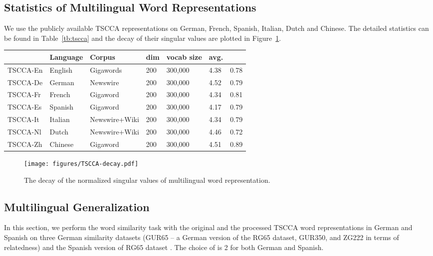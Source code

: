 \documentclass{article} \usepackage{acl2017,times}
\begin{document}
\subsection{Statistics of Multilingual Word Representations}
We use the publicly available TSCCA representations \citep{dhillon2012two} on German, French, Spanish, Italian, Dutch and Chinese. The detailed statistics can be found in Table~\ref{tb:tscca} and the decay of their singular values are plotted in Figure~\ref{fig:tscca-decay}.

\begin{table*}[!h]
\begin{center}
\begin{tabular}{|l|l|l|l|l|l|l|}
\hline
 &  \bf Language &  \bf Corpus &  \bf dim &  \bf vocab size &  \bf avg.  &  \\
\hline
TSCCA-En & English & Gigawords & 200 & 300,000 & 4.38 & 0.78 \\
TSCCA-De & German & Newswire & 200 & 300,000 & 4.52 & 0.79 \\
TSCCA-Fr & French & Gigaword & 200 & 300,000 & 4.34 & 0.81 \\
TSCCA-Es & Spanish & Gigaword & 200 & 300,000 & 4.17 & 0.79 \\
TSCCA-It & Italian & Newswire+Wiki & 200 & 300,000 & 4.34 & 0.79 \\
TSCCA-Nl & Dutch & Newswire+Wiki & 200 & 300,000 & 4.46 & 0.72 \\
TSCCA-Zh & Chinese & Gigaword & 200 & 300,000 & 4.51 & 0.89 \\
\hline 
\end{tabular}
\end{center}
\caption{A detailed description for the TSCCA embeddings in this paper.}
\label{tb:tscca}
\end{table*}


\begin{figure}[!h]
  \centering
  {
  \texttt{[image: figures/TSCCA-decay.pdf]}
  }
  \caption{The decay of the normalized singular values of multilingual word representation.}
  \label{fig:tscca-decay}
\end{figure}


\subsection{Multilingual Generalization }
\label{app:multilingual}

In this section, we perform the word similarity task with the original and the processed TSCCA word representations in German and Spanish on three German similarity datasets (GUR65 -- a German version of the RG65 dataset, GUR350, and ZG222 in terms of relatedness) \citep{zesch2006automatically} and the Spanish version of  RG65 dataset \citep{camacho2015framework}.  The choice of  is 2 for both German and Spanish.
\end{document}
